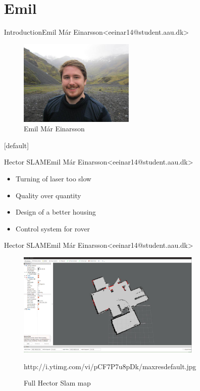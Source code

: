 \section{Emil}


\begin{frame}{Introduction}{Emil Már Einarsson\newline<eeinar14@student.aau.dk>}
	\begin{figure}[h!]
    	\includegraphics[width=0.5\textwidth]{images/emil.jpg}
    	\caption{Emil Már Einarsson}
		\centering    		
	\end{figure}
\end{frame}

[default]

\begin{frame}{Hector SLAM}{Emil Már Einarsson\newline<eeinar14@student.aau.dk>}
  \begin{itemize}
  	\item <2-> Turning of laser too slow
  	\item <3-> Quality over quantity
  	\item <4-> Design of a better housing
  	\item <5-> Control system for rover
  \end{itemize}
\end{frame}

\begin{frame}{Hector SLAM}{Emil Már Einarsson\newline<eeinar14@student.aau.dk>}
	\begin{figure}[h!]
    	\includegraphics[width=0.8\textwidth]{images/hectorslam.jpg}
    	\caption{Full Hector Slam map}
    	\tiny{http://i.ytimg.com/vi/pCF7P7u8pDk/maxresdefault.jpg}
		\centering    		
	\end{figure}
\end{frame}

